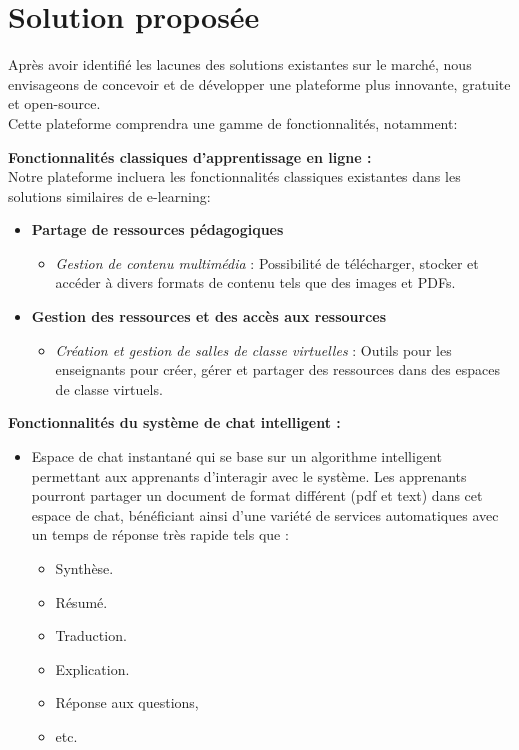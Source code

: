 \section{Solution proposée}
Après avoir identifié les lacunes des solutions existantes sur le marché, nous envisageons de concevoir et de développer une plateforme plus innovante, gratuite et open-source.\\
Cette plateforme comprendra une gamme de fonctionnalités, notamment:

\vspace{0.5em}
\noindent \textbf{Fonctionnalités classiques d'apprentissage en ligne :}\\
Notre plateforme incluera les fonctionnalités classiques existantes dans les solutions similaires de e-learning:
\begin{itemize}[itemsep=2pt, parsep=2pt]
    \item \textbf{Partage de ressources pédagogiques}
    \begin{itemize}
        \item \textit{Gestion de contenu multimédia} : Possibilité de télécharger, stocker et accéder à divers formats de contenu tels que des images et PDFs.
    \end{itemize}
    \item \textbf{Gestion des ressources et des accès aux ressources}
    \begin{itemize}
        \item \textit{Création et gestion de salles de classe virtuelles} : Outils pour les enseignants pour créer, gérer et partager des ressources dans des espaces de classe virtuels.
    \end{itemize}   
\end{itemize}
\vspace{0.5em}
\textbf{Fonctionnalités du système de chat intelligent :}
\begin{itemize}
    \item Espace de chat instantané qui se base sur un algorithme intelligent permettant aux apprenants d'interagir avec le système. Les apprenants pourront partager un document de format différent (pdf et text) dans cet espace de chat, bénéficiant ainsi d'une variété de services automatiques avec un temps de réponse très rapide tels que :
    \begin{itemize}[itemsep=2pt, parsep=2pt]
        \item Synthèse.
        \item Résumé.
        \item Traduction.
        \item Explication.
        \item Réponse aux questions, 
        \item etc.
    \end{itemize}
\end{itemize}
